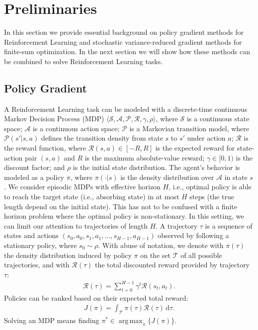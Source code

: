 \documentclass{article}
\makeatletter
\theoremstyle{remark}
\theoremstyle{definition}
\DeclareRobustCommand{\ie}{i.e.,\@\xspace}
\DeclareRobustCommand{\wrt}{w.r.t.\@\xspace}
\newcommand{\todomat}[1]{\todo[color=citrine, inline]{\small #1}}
\DeclareMathOperator*{\argmax}{arg\,max}
\newcommand{\de}{\,\mathrm{d}}
\newcommand{\Aspace}{\mathcal{A}}
\newcommand{\Sspace}{\mathcal{S}}
\newcommand{\Tspace}{\mathcal{T}}
\newcommand{\Transition}{\mathcal{P}}
\newcommand{\Reward}{\mathcal{R}}
\makeatother
\begin{document}
\todomat{work in progress}

\section{Preliminaries}
In this section we provide essential background on policy gradient methods for Reinforcement Learning and stochastic variance-reduced gradient methods for finite-sum optimization. In the next section we will show how these methods can be combined to solve Reinforcement Learning tasks.

\subsection{Policy Gradient}\label{subsec:PolicyGradient}
A Reinforcement Learning task \cite{sutton2011reinforcement} can be modeled with a discrete-time continuous Markov Decision Process (MDP) $\langle\Sspace,\Aspace,\Transition,\Reward,\gamma,\rho\rangle$, where $\Sspace$ is a continuous state space; $\Aspace$ is a continuous action space; $\Transition$ is a Markovian transition model, where $\Transition(s'|s,a)$ defines the transition density from state $s$ to $s'$ under action $a$; $\Reward$ is the reward function, where $\Reward(s,a) \in [-R,R]$ is the expected reward for state-action pair $(s,a)$ and $R$ is the maximum absolute-value reward; $\gamma\in[0,1)$ is the discount factor; and $\rho$ is the initial state distribution.
The agent's behavior is modeled as a policy $\pi$, where $\pi(\cdot|s)$ is the density distribution over $\Aspace$ in state $s$.
We consider episodic MDPs with effective horizon $H$, \ie optimal policy is able to reach the target state (\ie absorbing state) in at most $H$ steps (the true length depend on the initial state). This has not to be confused with a finite horizon problem where the optimal policy is non-stationary. In this setting, we can limit our attention to trajectories of length $H$. A trajectory $\tau$ is a sequence of states and actions $(s_0,a_0,s_1,a_1,\dots,s_{H-1},a_{H-1})$ observed by following a stationary policy, where $s_0 \sim \rho$.
With abuse of notation, we denote with $\pi(\tau)$ the density distribution induced by policy $\pi$ on the set $\Tspace$ of all possible trajectories, and with $\Reward(\tau)$ the total discounted reward provided by trajectory $\tau$:
\begin{align*}
\Reward(\tau) = \sum_{t=0}^{H-1}\gamma^t\Reward(s_t,a_t).
\end{align*}
Policies can be ranked based on their expected total reward:
\begin{align*}
	J(\pi) = \int_{\Tspace}\pi(\tau)\Reward(\tau)\de \tau.
\end{align*}
Solving an MDP means finding $\pi^* \in \argmax_{\pi} \{J(\pi)\}$.
\end{document}
